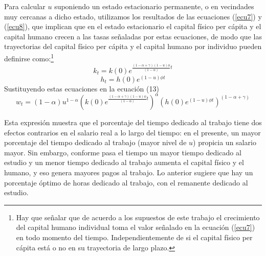 \documentclass[12pt,notitlepage]{report}
\newcommand{\suma}{(1-\alpha + \gamma)}
\newcommand{\fphi}{\frac{\suma (1-u)\phi}{(1-\alpha)}}
\begin{document}
	\addtocounter{footnote}{12}
	
	Para calcular $u$ suponiendo un estado estacionario permanente, o en vecindades muy cercanas a dicho estado, utilizamos los resultados de las ecuaciones (\ref{ecu7}) y (\ref{ecu8}), que implican que en el estado estacionario el capital físico per cápita y el capital humano crecen a las tasas señaladas por estas ecuaciones, de modo que las trayectorias del capital físico per cápita y el capital humano por individuo pueden definirse como:\footnote{Hay que señalar que de acuerdo a los supuestos de este trabajo el crecimiento del capital humano individual toma el valor señalado en la ecuación (\ref{ecu7}) en todo momento del tiempo. Independientemente de si el capital físico per cápita está o no en su trayectoria de largo plazo.}
	\begin{equation}\label{ecu14}
		k_t=k(0)e^{\fphi t}
	\end{equation}
	\begin{equation}\label{ecu15}
		h_t=h(0)e^{(1-u)\phi t}
	\end{equation}
	Sustituyendo estas ecuaciones en la ecuación (13)
	\begin{equation}\label{ecu16}
		w_t=(1-\alpha)u^{1-\alpha}(k(0)e^{\fphi t})^\alpha(h(0)e^{(1-u)\phi t})^{\suma}
	\end{equation}
	
	Esta expresión muestra que el porcentaje del tiempo dedicado al trabajo tiene dos efectos contrarios en el salario real a lo largo del tiempo: en el presente, un mayor porcentaje del tiempo dedicado al trabajo (mayor nivel de $u$) propicia un salario mayor. Sin embargo, conforme pasa el tiempo un mayor tiempo dedicado al estudio y un menor tiempo dedicado al trabajo aumenta el capital físico y el humano, y eso genera mayores pagos al trabajo. Lo anterior sugiere que hay un porcentaje óptimo de horas dedicado al trabajo, con el remanente dedicado al estudio.
	
\end{document}
